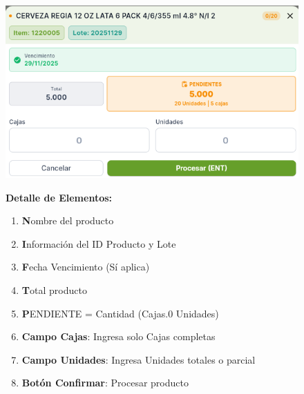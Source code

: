 \documentclass[12pt,a4paper]{report}
\begin{document}
\begin{figure}[H]
    \centering
    \begin{minipage}{1.0\textwidth}
        \centering
        \includegraphics[width=\textwidth]{pantallas/menuProcesarProducto.png}
    \end{minipage}
    \hfill
    \begin{minipage}{1.0\textwidth}
        \textbf{Detalle de Elementos:}
        \begin{enumerate}
            \item \textbf Nombre del producto
            \item \textbf Información del ID Producto y Lote
            \item \textbf Fecha Vencimiento (Sí aplica)
            \item \textbf Total producto
            \item \textbf PENDIENTE = Cantidad (Cajas.0 Unidades) 
            \item \textbf{Campo Cajas}: Ingresa solo Cajas completas
            \item \textbf{Campo Unidades}: Ingresa Unidades totales o parcial
            \item \textbf{Botón Confirmar}: Procesar producto
        \end{enumerate}
    \end{minipage}
\end{figure}
\end{document}
